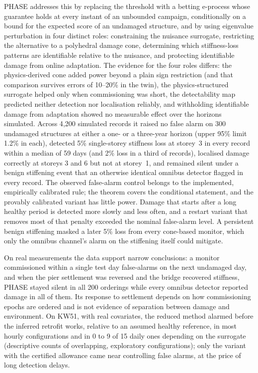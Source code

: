 \documentclass[12pt,a4paper]{article}
\newcommand{\rev}[1]{#1}
\newcommand{\rev}[1]{{\color{revcol}#1}}
\newcommand{\rtwo}[1]{#1}
\newcommand{\rtwo}[1]{{\color{revcolb}#1}}
\begin{document}
PHASE addresses this by replacing the threshold with a betting e-process whose guarantee holds at every instant of an unbounded campaign, \rev{conditionally on a bound for the expected score of an undamaged structure}, and by using eigenvalue perturbation in four distinct roles: constraining the nuisance surrogate, restricting the alternative to a polyhedral damage cone, determining which stiffness-loss patterns are identifiable relative to the nuisance, and protecting identifiable damage from online adaptation. \rev{The evidence for the four roles differs: the physics-derived cone added power beyond a plain sign restriction (and that comparison survives errors of 10--20\% in the twin), the physics-structured surrogate helped only when commissioning was short, the detectability map predicted neither detection nor localisation reliably, and withholding identifiable damage from adaptation showed no measurable effect over the horizons simulated.} Across \rev{4{,}200 simulated records} it raised no false alarm on 300 undamaged structures at either a one- or a three-year horizon \rev{(upper 95\% limit 1.2\% in each)}, detected 5\% single-storey stiffness loss at storey~3 in every record within a median of 59 days \rev{(and 2\% loss in a third of records)}, localised damage correctly at storeys 3 and 6 but not at storey~1, and remained silent under a benign stiffening event that an otherwise identical omnibus detector flagged in every record. \rev{The observed false-alarm control belongs to the implemented, empirically calibrated rule; the theorem covers the conditional statement, and the provably calibrated variant has little power. Damage that starts after a long healthy period is detected more slowly and less often, and a restart variant that removes most of that penalty exceeded the nominal false-alarm level. A persistent benign stiffening masked a later 5\% loss from every cone-based monitor, which only the omnibus channel's alarm on the stiffening itself could mitigate.}

On real measurements \rev{the data support narrow conclusions}: a monitor commissioned within a single test day false-alarms on the next undamaged day, and when the pier settlement was reversed and the bridge recovered stiffness, PHASE stayed silent in all 200 orderings while every omnibus detector reported damage in all of them. \rtwo{\rtwo{Its response to settlement depends on how commissioning epochs are ordered and is not evidence of separation between damage and environment.} \rtwo{On KW51, with real covariates, the reduced method alarmed before the inferred retrofit works, relative to an assumed healthy reference, in most hourly configurations and in 0 to 9 of 15 daily ones depending on the surrogate (descriptive counts of overlapping, exploratory configurations); only the variant with the certified allowance came near controlling false alarms, at the price of long detection delays.}}
\end{document}
